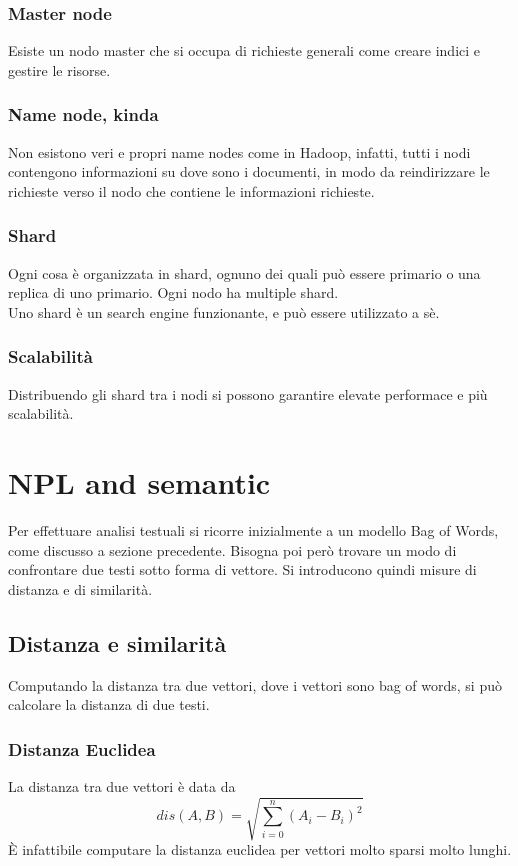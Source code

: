 \subsubsection{Master node}
Esiste un nodo master che si occupa di richieste 
generali come creare indici e gestire le risorse.

\subsubsection{Name node, kinda}
Non esistono veri e propri name nodes come in Hadoop, infatti, tutti i nodi contengono
informazioni su dove sono i documenti, in modo da reindirizzare le richieste verso 
il nodo che contiene le informazioni richieste.

\subsubsection{Shard}
Ogni cosa è organizzata in shard, ognuno dei quali 
può essere primario o una replica di uno primario.
Ogni nodo ha multiple shard.\\
Uno shard è un search engine funzionante, e può essere utilizzato a sè.

\subsubsection{Scalabilità}
Distribuendo gli shard tra i nodi si possono garantire elevate performace
e più scalabilità.

\section{NPL and semantic}
Per effettuare analisi testuali si ricorre inizialmente a un modello Bag of Words, 
come discusso a sezione precedente. Bisogna poi però trovare un modo di confrontare due 
testi sotto forma di vettore. Si introducono quindi misure di distanza e di similarità.

\subsection{Distanza e similarità}
Computando la distanza tra due vettori, dove i vettori sono bag of words, si può 
calcolare la distanza di due testi.

\subsubsection{Distanza Euclidea}
La distanza tra due vettori è data da
$$
    dis(A, B) = \sqrt{\sum_{i=0}^{n} (A_i - B_i)^2}
$$
È infattibile computare la distanza euclidea per vettori molto sparsi molto lunghi.

